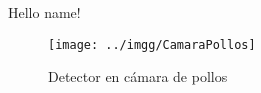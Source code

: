\documentclass{article}
\begin{document}
  Hello {{name}}!
  \begin{figure}[h!]
    \centering
        \texttt{[image: ../imgg/CamaraPollos]}
      \caption{Detector en cámara de pollos}
  \end{figure}
\end{document}
